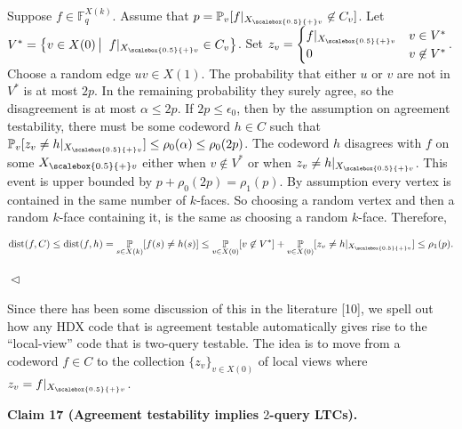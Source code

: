 \documentclass[10pt,a4paper]{article}
\begin{document}
Suppose $f\in\mathbb{F}_{q}^{X(k)}$.
Assume that $p=\operatorname*{\mathbb{P}}_{v}[f|_{{X}_{\scalebox{0.5}{+}v}}\not\in C_{v}]$. Let $V^{*}=\left\{v\in X(0)\left|\;\vphantom{v\in X(0)f|_{{X}_{\scalebox{0.5}{+}v}}\in C_{v}}\right.f|_{{X}_{\scalebox{0.5}{+}v}}\in C_{v}\right\}$. Set $z_{v}=\begin{cases}f|_{{X}_{\scalebox{0.5}{+}v}}&v\in V^{*}\\
0&v\not\in V^{*}\end{cases}$.
Choose a random edge $uv\in X(1)$. The probability that either $u$ or $v$ are not in $V^{*}$ is at most $2p$. In the remaining probability they surely agree, so the disagreement is at most $\alpha\leq 2p$.
If $2p\leq\epsilon_{0}$, then by the assumption on agreement testability, there must be some codeword $h\in C$ such that
$\operatorname*{\mathbb{P}}_{v}[z_{v}\neq h|_{{X}_{\scalebox{0.5}{+}v}}]\leq\rho_{0}(\alpha)\leq\rho_{0}(2p)$.
The codeword $h$ disagrees with $f$ on some ${X}_{\scalebox{0.5}{+}v}$ either when $v\not\in V^{*}$ or when $z_{v}\neq h|_{{X}_{\scalebox{0.5}{+}v}}$. This event is upper bounded by $p+\rho_{0}(2p)=\rho_{1}(p)$. By assumption every vertex is contained in the same number of $k$-faces. So choosing a random vertex and then a random $k$-face containing it, is the same as choosing a random $k$-face. Therefore,\par


\[\begin{gathered}
\operatorname{dist}(f,C)\leq\operatorname{dist}(f,h)=\operatorname*{\mathbb{P}}_{s\in X(k)}[f(s)\neq h(s)]\leq\operatorname*{\mathbb{P}}_{v\in X(0)}[v\not\in V^{*}]+\operatorname*{\mathbb{P}}_{v\in X(0)}[z_{v}\neq h|_{{X}_{\scalebox{0.5}{+}v}}]\leq\rho_{1}(p).
\end{gathered}\]


$\vartriangleleft$\par




Since there has been some discussion of this in the literature [10], we spell out how any HDX code that is agreement testable automatically gives rise to the “local-view” code that is two-query testable. The idea is to move from a codeword $f\in C$ to the collection $\{z_{v}\}_{v\in X(0)}$ of local views where $z_{v}=f|_{{X}_{\scalebox{0.5}{+}v}}$.\par





\par\medskip\noindent\textbf{
Claim 17 (Agreement testability implies $2$-query LTCs). 
}\par
\end{document}
